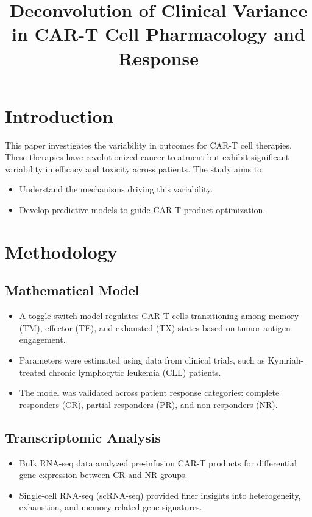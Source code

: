 \documentclass[12pt]{article}
\title{\textbf{Deconvolution of Clinical Variance in CAR-T Cell Pharmacology and Response}}
\author{}
\date{}
\begin{document}
\maketitle

\section*{Introduction}
This paper investigates the variability in outcomes for CAR-T cell therapies. These therapies have revolutionized cancer treatment but exhibit significant variability in efficacy and toxicity across patients. The study aims to:
\begin{itemize}
    \item Understand the mechanisms driving this variability.
    \item Develop predictive models to guide CAR-T product optimization.
\end{itemize}

\section*{Methodology}

\subsection*{Mathematical Model}
\begin{itemize}
    \item A toggle switch model regulates CAR-T cells transitioning among memory (TM), effector (TE), and exhausted (TX) states based on tumor antigen engagement.
    \item Parameters were estimated using data from clinical trials, such as Kymriah-treated chronic lymphocytic leukemia (CLL) patients.
    \item The model was validated across patient response categories: complete responders (CR), partial responders (PR), and non-responders (NR).
\end{itemize}

\subsection*{Transcriptomic Analysis}
\begin{itemize}
    \item Bulk RNA-seq data analyzed pre-infusion CAR-T products for differential gene expression between CR and NR groups.
    \item Single-cell RNA-seq (scRNA-seq) provided finer insights into heterogeneity, exhaustion, and memory-related gene signatures.
\end{itemize}
\end{document}
